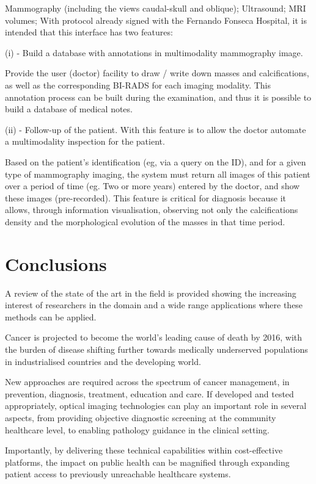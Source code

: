 Mammography (including the views caudal-skull and oblique);
Ultrasound;
MRI volumes;
With protocol already signed with the Fernando Fonseca Hospital, it is intended that this interface has two features:

(i) - Build a database with annotations in multimodality mammography image.

Provide the user (doctor) facility to draw / write down masses and calcifications, as well as the corresponding BI-RADS for each imaging modality. This annotation process can be built during the examination, and thus it is possible to build a database of medical notes.

(ii) - Follow-up of the patient. With this feature is to allow the doctor automate a multimodality inspection for the patient.

Based on the patient's identification (eg, via a query on the ID), and for a given type of mammography imaging, the system must return all images of this patient over a period of time (eg. Two or more years) entered by the doctor, and show these images (pre-recorded). This feature is critical for diagnosis because it allows, through information visualisation, observing not only the calcifications density and the morphological evolution of the masses in that time period.

\clearpage

\section{Conclusions}

A review of the state of the art in the field is provided showing the increasing interest of researchers in the domain and a wide range applications where these methods can be applied.

Cancer is projected to become the world's leading cause of death by 2016, with the burden of disease shifting further towards medically underserved populations in industrialised countries and the developing world.

New approaches are required across the spectrum of cancer management, in prevention, diagnosis, treatment, education and care. If developed and tested appropriately, optical imaging technologies can play an important role in several aspects, from providing objective diagnostic screening at the community healthcare level, to enabling pathology guidance in the clinical setting.

Importantly, by delivering these technical capabilities within cost-effective platforms, the impact on public health can be magnified through expanding patient access to previously unreachable healthcare systems.

